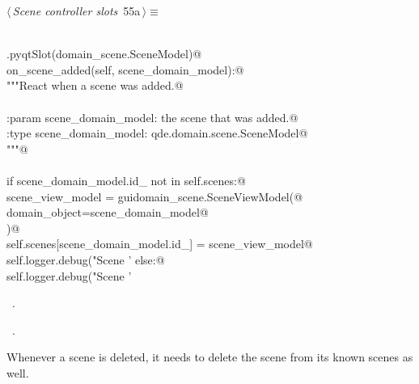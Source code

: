 \documentclass[
    a4paper,      %
    10pt,         %
    openright,    %
    notitlepage,  %
    parskip=half, %
]{scrreprt}       %
\theoremstyle{definition}                    %
\begin{document}
\begin{flushleft} \small
\begin{minipage}{\linewidth}\label{scrap84}\raggedright\small
{} $\langle\,${\itshape Scene controller slots}\nobreak\ {\footnotesize {55a}}$\,\rangle\equiv$
\vspace{-1exm}
\begin{list}{}{} \item
\mbox{}\lstinline@@\\
\mbox{}\lstinline@QtCore.pyqtSlot(domain_scene.SceneModel)@\\
\mbox{}\lstinline@def on_scene_added(self, scene_domain_model):@\\
\mbox{}\lstinline@    """React when a scene was added.@\\
\mbox{}\lstinline@@\\
\mbox{}\lstinline@    :param scene_domain_model: the scene that was added.@\\
\mbox{}\lstinline@    :type scene_domain_model:  qde.domain.scene.SceneModel@\\
\mbox{}\lstinline@    """@\\
\mbox{}\lstinline@@\\
\mbox{}\lstinline@    if scene_domain_model.id_ not in self.scenes:@\\
\mbox{}\lstinline@        scene_view_model = guidomain_scene.SceneViewModel(@\\
\mbox{}\lstinline@            domain_object=scene_domain_model@\\
\mbox{}\lstinline@        )@\\
\mbox{}\lstinline@        self.scenes[scene_domain_model.id_] = scene_view_model@\\
\mbox{}\lstinline@        self.logger.debug("Scene '%s' was added" % scene_view_model)@\\
\mbox{}\lstinline@    else:@\\
\mbox{}\lstinline@        self.logger.debug("Scene '%s' already known" % scene)@\\
\mbox{}\lstinline@@{\NWsep}
\end{list}
\vspace{-1.5ex}
\footnotesize
\begin{list}{}{\setlength{\itemsep}{-\parsep}\setlength{\itemindent}{-\leftmargin}}
\item \NWtxtMacroDefBy\ .
\item \NWtxtMacroRefIn\ .

\item{}
\end{list}
\end{minipage}\vspace{4ex}
\end{flushleft}
Whenever a scene is deleted, it needs to delete the scene from its known scenes
as well.
\end{document}
